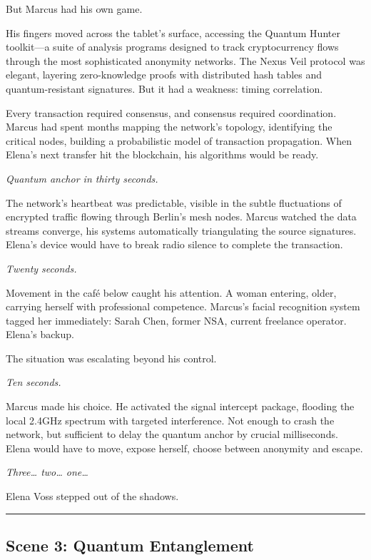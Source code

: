 \documentclass[12pt,letterpaper]{book}
\begin{document}
But Marcus had his own game.

His fingers moved across the tablet's surface, accessing the Quantum Hunter toolkit---a suite of analysis programs designed to track cryptocurrency flows through the most sophisticated anonymity networks. The Nexus Veil protocol was elegant, layering zero-knowledge proofs with distributed hash tables and quantum-resistant signatures. But it had a weakness: timing correlation.

Every transaction required consensus, and consensus required coordination. Marcus had spent months mapping the network's topology, identifying the critical nodes, building a probabilistic model of transaction propagation. When Elena's next transfer hit the blockchain, his algorithms would be ready.

\emph{Quantum anchor in thirty seconds.}

The network's heartbeat was predictable, visible in the subtle fluctuations of encrypted traffic flowing through Berlin's mesh nodes. Marcus watched the data streams converge, his systems automatically triangulating the source signatures. Elena's device would have to break radio silence to complete the transaction.

\emph{Twenty seconds.}

Movement in the café below caught his attention. A woman entering, older, carrying herself with professional competence. Marcus's facial recognition system tagged her immediately: Sarah Chen, former NSA, current freelance operator. Elena's backup.

The situation was escalating beyond his control.

\emph{Ten seconds.}

Marcus made his choice. He activated the signal intercept package, flooding the local 2.4GHz spectrum with targeted interference. Not enough to crash the network, but sufficient to delay the quantum anchor by crucial milliseconds. Elena would have to move, expose herself, choose between anonymity and escape.

\emph{Three\ldots{} two\ldots{} one\ldots{}}

Elena Voss stepped out of the shadows.

\begin{center}\rule{0.5\linewidth}{0.5pt}\end{center}

\hypertarget{scene-3-quantum-entanglement}{%
\subsection{Scene 3: Quantum Entanglement}\label{scene-3-quantum-entanglement}}
\end{document}
